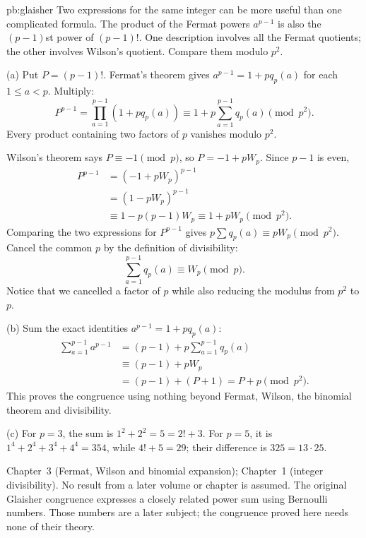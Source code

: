 \begin{solution}{pb:glaisher}
\idea Two expressions for the same integer can be more useful than
one complicated formula. The product of the Fermat powers
$a^{p-1}$ is also the $(p-1)$st power of $(p-1)!$.
One description involves all the Fermat quotients;
the other involves Wilson's quotient. Compare them modulo $p^2$.

\writeup (a) Put $P=(p-1)!$. Fermat's theorem gives
$a^{p-1}=1+pq_p(a)$ for each $1\le a<p$. Multiply:
\[
P^{p-1}
 =\prod_{a=1}^{p-1}(1+pq_p(a))
 \equiv1+p\sum_{a=1}^{p-1}q_p(a)\pmod{p^2}.
\]
Every product containing two factors of $p$ vanishes
modulo $p^2$.

Wilson's theorem says $P\equiv-1\pmod p$, so
$P=-1+pW_p$. Since $p-1$ is even,
\[
\begin{aligned}
P^{p-1}
&=(-1+pW_p)^{p-1}\\
&=(1-pW_p)^{p-1}\\
&\equiv1-p(p-1)W_p
 \equiv1+pW_p\pmod{p^2}.
\end{aligned}
\]
Comparing the two expressions for $P^{p-1}$ gives
$p\sum q_p(a)\equiv pW_p\pmod{p^2}$.
Cancel the common $p$ by the definition of divisibility:
\[
\sum_{a=1}^{p-1}q_p(a)\equiv W_p\pmod p.
\]
Notice that we cancelled a factor of $p$ while
also reducing the modulus from $p^2$ to $p$.

(b) Sum the exact identities $a^{p-1}=1+pq_p(a)$:
\[
\begin{aligned}
\sum_{a=1}^{p-1}a^{p-1}
&=(p-1)+p\sum_{a=1}^{p-1}q_p(a)\\
&\equiv(p-1)+pW_p\\
&=(p-1)+(P+1)=P+p\pmod{p^2}.
\end{aligned}
\]
This proves the congruence using nothing beyond
Fermat, Wilson, the binomial theorem and divisibility.

(c) For $p=3$, the sum is $1^2+2^2=5=2!+3$.
For $p=5$, it is
$1^4+2^4+3^4+4^4=354$, while $4!+5=29$;
their difference is $325=13\cdot25$.

\tools Chapter~3 (Fermat, Wilson and binomial expansion);
Chapter~1 (integer divisibility). No result from a later
volume or chapter is assumed.
\leads The original Glaisher congruence expresses a closely
related power sum using Bernoulli numbers. Those numbers
are a later subject; the congruence proved here needs none
of their theory.
\end{solution}

